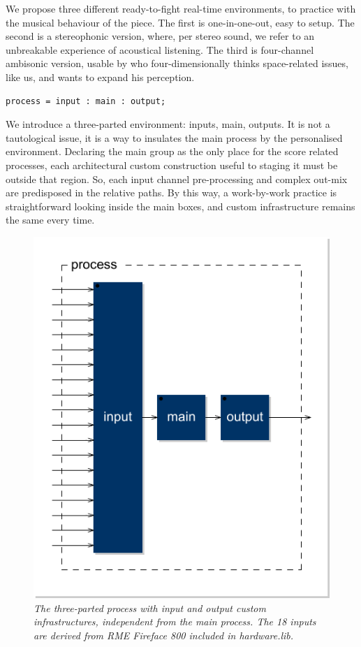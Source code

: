 \documentclass[twoside,a4paper]{article}
\begin{document}
We propose three different ready-to-fight real-time environments, to practice with the musical behaviour of the piece. The first is one-in-one-out, easy to setup. The second is a stereophonic version, where, per stereo sound, we refer to an unbreakable experience of acoustical listening. \cite{ab58} The third is four-channel ambisonic version, usable by who four-dimensionally thinks space-related issues, like us, and wants to expand his perception. 

\begin{lstlisting}
process = input : main : output;
\end{lstlisting}

We introduce a three-parted environment: inputs, main, outputs. It is not a tautological issue, it is a way to insulates the main process by the personalised environment. Declaring the main group as the only place for the score related processes, each architectural custom construction useful to staging it must be outside that region. So, each input channel pre-processing and complex out-mix are predisposed in the relative paths. By this way, a work-by-work practice is straightforward looking inside the main boxes, and custom infrastructure remains the same every time. 

\begin{figure}[ht]
\centerline{\includegraphics[width=.45\textwidth]{img/lais-process}}
\caption{\label{re-dia-6c}{\it The three-parted process with input and output custom infrastructures, independent from the main process. The 18 inputs are derived from \emph{RME Fireface 800} included in \emph{hardware.lib}.}}
\end{figure}

\end{document}
